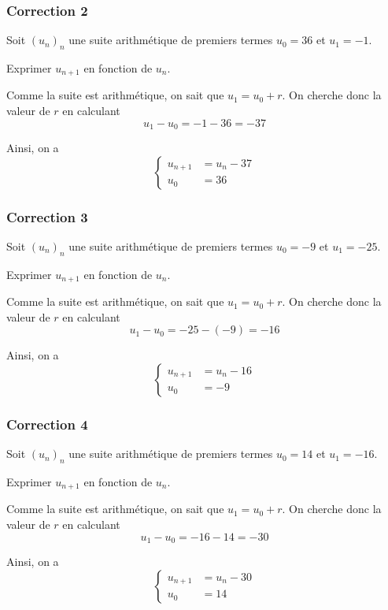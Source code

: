 \documentclass[15pt, mathserif]{beamer}
\begin{document}
\begin{frame}
\vspace{-10mm}
	\frametitle{Correction 2}
Soit $(u_n)_n$ une suite arithmétique de premiers termes $u_0=36$ et $u_1=-1$. 
 
 Exprimer $u_{n+1}$ en fonction de $u_n$. 
 
 \vspace*{1cm} 
 
 Comme la suite est arithmétique, on sait que $u_1=u_0+r$. On cherche donc la valeur de $r$ en calculant $$u_1-u_0=-1-36=-37$$ 
 
 Ainsi, on a $$ \left\{ 
 \begin{array}{ll} 
 u_{n+1} &= u_n -37 \\ 
 u_0 & = 36 
 \end{array} 
 \right. $$ 
 \end{frame}


\begin{frame}
\vspace{-10mm}
	\frametitle{Correction 3}
Soit $(u_n)_n$ une suite arithmétique de premiers termes $u_0=-9$ et $u_1=-25$. 
 
 Exprimer $u_{n+1}$ en fonction de $u_n$. 
 
 \vspace*{1cm} 
 
 Comme la suite est arithmétique, on sait que $u_1=u_0+r$. On cherche donc la valeur de $r$ en calculant $$u_1-u_0=-25-\left(-9\right)=-16$$ 
 
 Ainsi, on a $$ \left\{ 
 \begin{array}{ll} 
 u_{n+1} &= u_n -16 \\ 
 u_0 & = -9 
 \end{array} 
 \right. $$ 
 \end{frame}


\begin{frame}
\vspace{-10mm}
	\frametitle{Correction 4}
Soit $(u_n)_n$ une suite arithmétique de premiers termes $u_0=14$ et $u_1=-16$. 
 
 Exprimer $u_{n+1}$ en fonction de $u_n$. 
 
 \vspace*{1cm} 
 
 Comme la suite est arithmétique, on sait que $u_1=u_0+r$. On cherche donc la valeur de $r$ en calculant $$u_1-u_0=-16-14=-30$$ 
 
 Ainsi, on a $$ \left\{ 
 \begin{array}{ll} 
 u_{n+1} &= u_n -30 \\ 
 u_0 & = 14 
 \end{array} 
 \right. $$ 
 \end{frame}
\end{document}
